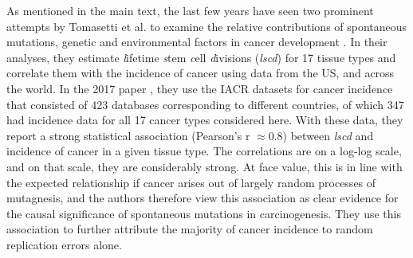 \documentclass[12pt,onecolumn,twoside]{article}
\begin{document}
	As mentioned in the main text, the last few years have seen two prominent attempts by Tomasetti et al. to examine the relative contributions of spontaneous mutations, genetic and environmental factors in cancer development \autocite{Tomasetti78, Tomasetti2017}.  In their analyses, they estimate \textit{l}ifetime \textit{s}tem \textit{c}ell \textit{d}ivisions (\textit{lscd}) for 17 tissue types and correlate them with the incidence of cancer using data from the US, and across the world. In the 2017 paper \autocite{Tomasetti2017}, they use the IACR datasets for cancer incidence that consisted of 423 databases corresponding to different countries, of which 347 had incidence data for all 17 cancer types considered here. With these data, they report a strong statistical association (Pearson’s r $\approx 0.8$) between \textit{lscd} and incidence of cancer in a given tissue type. The correlations are on a log-log scale, and on that scale, they are considerably strong. At face value, this is in line with the expected relationship if cancer arises out of largely random processes of mutagnesis, and the authors therefore view this association as clear evidence for the causal significance of spontaneous mutations in carcinogenesis. They use this association to further attribute the majority of cancer incidence to random replication errors alone.

		\renewcommand{\thefigure}{S3.\arabic{figure}}
		\setcounter{figure}{0}

		\renewcommand{\thetable}{S3.\arabic{table}}
		\setcounter{table}{0}
\end{document}
